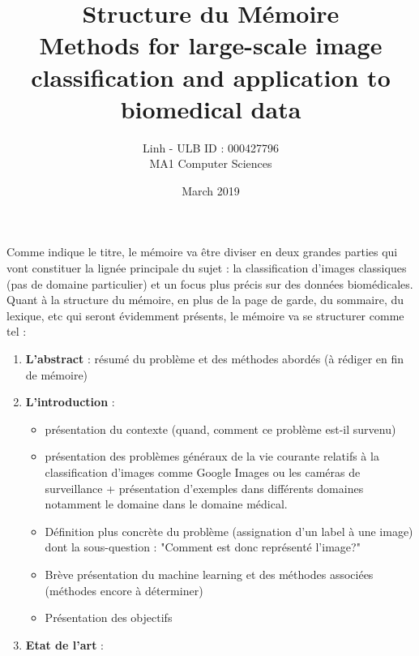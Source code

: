 \documentclass{article}
\title{Structure du Mémoire \\ Methods for large-scale image classification and application to biomedical data}
\author{\bsc{BUI QUANG PHUONG} Linh - ULB ID : 000427796 \\ MA1 Computer Sciences}
\date{March 2019}
\begin{document}
\maketitle

Comme indique le titre, le mémoire va être diviser en deux grandes parties qui vont constituer la lignée principale du sujet : la classification d'images classiques (pas de domaine particulier) et un focus plus précis sur des données biomédicales. \\

Quant à la structure du mémoire, en plus de la page de garde, du sommaire, du lexique, etc qui seront évidemment présents, le mémoire va se structurer comme tel :

\begin{enumerate}
\item \textbf{L'abstract} : résumé du problème et des méthodes abordés (à rédiger en fin de mémoire) 
\item \textbf{L'introduction} : 
\begin{itemize}
\item présentation du contexte (quand, comment ce problème est-il survenu) 
\item présentation des problèmes généraux de la vie courante relatifs à la classification d'images comme Google Images ou les caméras de surveillance + présentation d'exemples dans différents domaines notamment le domaine dans le domaine médical. 
\item Définition plus concrète du problème (assignation d'un label à une image) dont la sous-question : "Comment est donc représenté l'image?"
\item Brève présentation du machine learning et des méthodes associées (méthodes encore à déterminer) 
\item Présentation des objectifs 
\end{itemize}  

\item \textbf{Etat de l'art} : 

\end{enumerate} 
\end{document}
